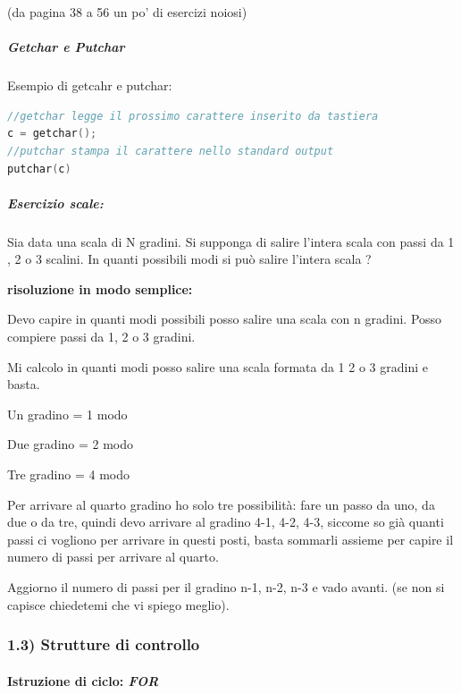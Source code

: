 \documentclass[
  paper=a4,
  oneside  ,captions=tableheading
]{scrbook}
\begin{document}
(da pagina 38 a 56 un po' di esercizi noiosi)

\hypertarget{getchar-e-putchar}{%
\subparagraph{Getchar e Putchar}\label{getchar-e-putchar}}
Esempio di getcahr e putchar:

\begin{lstlisting}[language={C++}]
//getchar legge il prossimo carattere inserito da tastiera
c = getchar();
//putchar stampa il carattere nello standard output
putchar(c)
\end{lstlisting}

\hypertarget{esercizio-scale}{%
\subparagraph{Esercizio scale:}\label{esercizio-scale}}

Sia data una scala di N gradini. Si supponga di salire l'intera scala
con passi da 1 , 2 o 3 scalini. In quanti possibili modi si può salire
l'intera scala ?

\textbf{risoluzione in modo semplice:}

Devo capire in quanti modi possibili posso salire una scala con n
gradini. Posso compiere passi da 1, 2 o 3 gradini.

Mi calcolo in quanti modi posso salire una scala formata da 1 2 o 3
gradini e basta.

Un gradino = 1 modo

Due gradino = 2 modo

Tre gradino = 4 modo

Per arrivare al quarto gradino ho solo tre possibilità: fare un passo da
uno, da due o da tre, quindi devo arrivare al gradino 4-1, 4-2, 4-3,
siccome so già quanti passi ci vogliono per arrivare in questi posti,
basta sommarli assieme per capire il numero di passi per arrivare al
quarto.

Aggiorno il numero di passi per il gradino n-1, n-2, n-3 e vado avanti.
(se non si capisce chiedetemi che vi spiego meglio).

\hypertarget{strutture-di-controllo}{%
\subsubsection{1.3) Strutture di
controllo}\label{strutture-di-controllo}}

\hypertarget{istruzione-di-ciclo-for}{%
\paragraph{\texorpdfstring{Istruzione di ciclo:
\emph{FOR}}{Istruzione di ciclo: FOR}}\label{istruzione-di-ciclo-for}}
\end{document}
